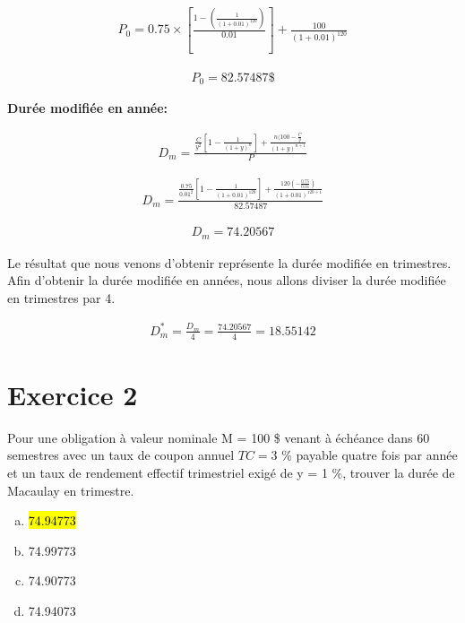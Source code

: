 \documentclass[10pt,a4paper]{article}
\begin{document}
\begin{align*}
P_0=0.75 \times \left[ \frac{1-\left(\frac{1}{(1+0.01)^{120}} \right)}{0.01} \right]+\frac{100}{(1+0.01)^{120}}
\end{align*}

\begin{align*}
P_0=82.57487 \$
\end{align*}

\vspace{0.5cm}

\textbf{Durée modifiée en année:}

\begin{align*}
D_m=\frac{\frac{C}{y^2} \left[ 1-\frac{1}{(1+y)^n} \right] +\frac{n(100-\frac{C}{y}}{(1+y)^{n+1}}}{P}
\end{align*}

\begin{align*}
D_m=\frac{\frac{0.75}{0.01^2} \left[ 1-\frac{1}{(1+0.01)^{120}} \right] +\frac{120\left(-\frac{0.75}{0.01}\right)}{(1+0.01)^{120+1}}}{82.57487}
\end{align*}

\begin{align*}
D_m = 74.20567 
\end{align*}

Le résultat que nous venons d'obtenir représente la durée modifiée en trimestres.  Afin d'obtenir la durée modifiée en années,  nous allons diviser la durée modifiée en trimestres par 4. 

\begin{align*}
D_m^* =\frac{D_m}{4}= \frac{74.20567}{4} = 18.55142
\end{align*}

\newpage

\section*{Exercice 2}
Pour une obligation à valeur nominale M = 100 \$ venant à échéance dans 60 semestres avec un taux de coupon annuel $TC= 3$ \% payable quatre fois par année et un taux de rendement effectif trimestriel exigé de y = 1 \%,  trouver la durée de Macaulay en trimestre.


\begin{enumerate}[a)]
\item \hl{74.94773}
\item 74.99773 
\item 74.90773 
\item 74.94073 
\end{enumerate}
\end{document}
